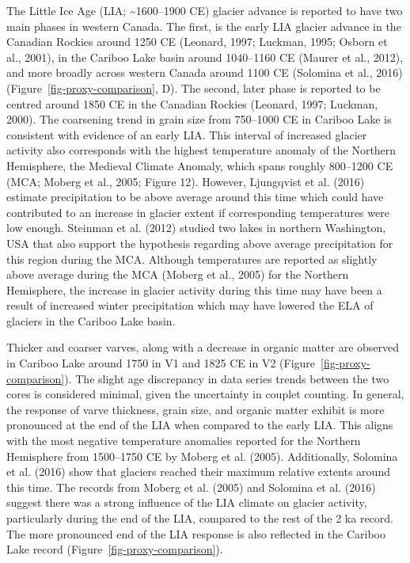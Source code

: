 \documentclass[
  letterpaper,
  DIV=11,
  numbers=noendperiod]{scrartcl}
\begin{document}
The Little Ice Age (LIA; \textasciitilde1600--1900 CE) glacier advance
is reported to have two main phases in western Canada. The first, is the
early LIA glacier advance in the Canadian Rockies around 1250 CE
(Leonard, 1997; Luckman, 1995; Osborn et al., 2001), in the Cariboo Lake
basin around 1040--1160 CE (Maurer et al., 2012), and more broadly
across western Canada around 1100 CE (Solomina et al., 2016)
(Figure~\ref{fig-proxy-comparison}, D). The second, later phase is
reported to be centred around 1850 CE in the Canadian Rockies (Leonard,
1997; Luckman, 2000). The coarsening trend in grain size from 750--1000
CE in Cariboo Lake is consistent with evidence of an early LIA. This
interval of increased glacier activity also corresponds with the highest
temperature anomaly of the Northern Hemisphere, the Medieval Climate
Anomaly, which spans roughly 800--1200 CE (MCA; Moberg et al., 2005;
Figure 12). However, Ljungqvist et al. (2016) estimate precipitation to
be above average around this time which could have contributed to an
increase in glacier extent if corresponding temperatures were low
enough. Steinman et al. (2012) studied two lakes in northern Washington,
USA that also support the hypothesis regarding above average
precipitation for this region during the MCA. Although temperatures are
reported as slightly above average during the MCA (Moberg et al., 2005)
for the Northern Hemisphere, the increase in glacier activity during
this time may have been a result of increased winter precipitation which
may have lowered the ELA of glaciers in the Cariboo Lake basin.

Thicker and coarser varves, along with a decrease in organic matter are
observed in Cariboo Lake around 1750 in V1 and 1825 CE in V2
(Figure~\ref{fig-proxy-comparison}). The slight age discrepancy in data
series trends between the two cores is considered minimal, given the
uncertainty in couplet counting. In general, the response of varve
thickness, grain size, and organic matter exhibit is more pronounced at
the end of the LIA when compared to the early LIA. This aligns with the
most negative temperature anomalies reported for the Northern Hemisphere
from 1500--1750 CE by Moberg et al. (2005). Additionally, Solomina et
al. (2016) show that glaciers reached their maximum relative extents
around this time. The records from Moberg et al. (2005) and Solomina et
al. (2016) suggest there was a strong influence of the LIA climate on
glacier activity, particularly during the end of the LIA, compared to
the rest of the 2 ka record. The more pronounced end of the LIA response
is also reflected in the Cariboo Lake record
(Figure~\ref{fig-proxy-comparison}).
\end{document}
